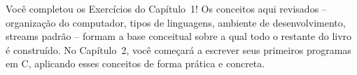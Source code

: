 \documentclass[12pt,a4paper]{article}
\begin{document}
\bigskip

\begin{boaprática}
  Você completou os Exercícios do Capítulo~1! Os conceitos aqui revisados --
  organização do computador, tipos de linguagens, ambiente de desenvolvimento,
  streams padrão -- formam a base conceitual sobre a qual todo o restante do
  livro é construído. No Capítulo~2, você começará a escrever seus primeiros
  programas em C, aplicando esses conceitos de forma prática e concreta.
\end{boaprática}
\end{document}
